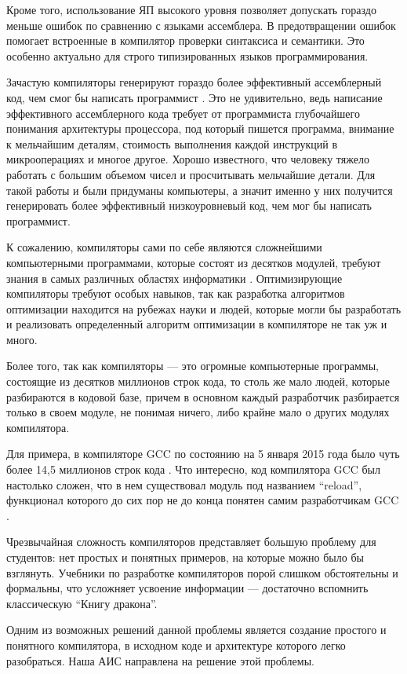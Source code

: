 \documentclass[14pt,russian]{extarticle}
\begin{document}
Кроме того, использование ЯП высокого уровня позволяет допускать гораздо меньше
ошибок по сравнению с языками ассемблера. В предотвращении ошибок помогает
встроенные в компилятор проверки синтаксиса и семантики. Это особенно актуально
для строго типизированных языков программирования.

Зачастую компиляторы генерируют гораздо более эффективный ассемблерный код, чем
смог бы написать программист \cite{randall1}. Это не удивительно, ведь написание эффективного
ассемблерного кода требует от программиста глубочайшего понимания архитектуры
процессора, под который пишется программа, внимание к мельчайшим деталям,
стоимость выполнения каждой инструкций в микрооперациях и многое другое. Хорошо
известного, что человеку тяжело работать с большим объемом чисел и просчитывать
мельчайшие детали. Для такой работы и были придуманы компьютеры, а значит именно
у них получится генерировать более эффективный низкоуровневый код, чем мог бы
написать программист.

К сожалению, компиляторы сами по себе являются сложнейшими компьютерными
программами, которые состоят из десятков модулей, требуют знания в самых
различных областях информатики \cite{Aho1}. Оптимизирующие компиляторы требуют особых
навыков, так как разработка алгоритмов оптимизации находится на рубежах науки и
людей, которые могли бы разработать и реализовать определенный алгоритм
оптимизации в компиляторе не так уж и много.

Более того, так как компиляторы --- это огромные компьютерные программы, состоящие
из десятков миллионов строк кода, то столь же мало людей, которые разбираются в
кодовой базе, причем в основном каждый разработчик разбирается только в своем
модуле, не понимая ничего, либо крайне мало о других модулях компилятора.

Для примера, в компиляторе GCC по состоянию на 5 января 2015 года было чуть
более 14,5 миллионов строк кода \cite{gcc1}. Что интересно, код компилятора GCC
был настолько сложен, что в нем существовал модуль под названием
\enquote{reload}, функционал которого до сих пор не до конца понятен самим
разработчикам GCC \cite{gcc2}.

Чрезвычайная сложность компиляторов представляет большую проблему для студентов:
нет простых и понятных примеров, на которые можно было бы взглянуть. Учебники по
разработке компиляторов порой слишком обстоятельны и формальны, что усложняет
усвоение информации --- достаточно вспомнить классическую \enquote{Книгу
дракона}.

Одним из возможных решений данной проблемы является создание простого и
понятного компилятора, в исходном коде и архитектуре которого легко разобраться.
Наша АИС направлена на решение этой проблемы.
\end{document}
